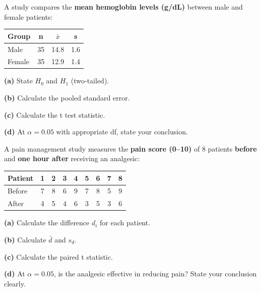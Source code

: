 \documentclass[
  12pt,
  letterpaper,
]{book}
\newcounter{none} %
\begin{document}
\begin{tcolorbox}[enhanced jigsaw, arc=.35mm, bottomrule=.15mm, bottomtitle=1mm, breakable, colback=white, colbacktitle=quarto-callout-caution-color!10!white, colframe=quarto-callout-caution-color-frame, coltitle=black, left=2mm, leftrule=.75mm, opacityback=0, opacitybacktitle=0.6, rightrule=.15mm, title={✏️ Exercise 2 --- Independent Samples t-Test}, titlerule=0mm, toprule=.15mm, toptitle=1mm]

A study compares the \textbf{mean hemoglobin levels (g/dL)} between male
and female patients:

{\def\LTcaptype{none} %
\begin{longtable}[]{@{}lccc@{}}
\toprule\noalign{}
Group & n & \(\bar{x}\) & s \\
\midrule\noalign{}
\endhead
\bottomrule\noalign{}
\endlastfoot
Male & 35 & 14.8 & 1.6 \\
Female & 35 & 12.9 & 1.4 \\
\end{longtable}
}

\textbf{(a)} State \(H_0\) and \(H_1\) (two-tailed).

\textbf{(b)} Calculate the pooled standard error.

\textbf{(c)} Calculate the t test statistic.

\textbf{(d)} At \(\alpha = 0.05\) with appropriate df, state your
conclusion.

\end{tcolorbox}

\begin{tcolorbox}[enhanced jigsaw, arc=.35mm, bottomrule=.15mm, bottomtitle=1mm, breakable, colback=white, colbacktitle=quarto-callout-caution-color!10!white, colframe=quarto-callout-caution-color-frame, coltitle=black, left=2mm, leftrule=.75mm, opacityback=0, opacitybacktitle=0.6, rightrule=.15mm, title={✏️ Exercise 3 --- Paired Samples t-Test}, titlerule=0mm, toprule=.15mm, toptitle=1mm]

A pain management study measures the \textbf{pain score (0--10)} of 8
patients \textbf{before} and \textbf{one hour after} receiving an
analgesic:

{\def\LTcaptype{none} %
\begin{longtable}[]{@{}lcccccccc@{}}
\toprule\noalign{}
Patient & 1 & 2 & 3 & 4 & 5 & 6 & 7 & 8 \\
\midrule\noalign{}
\endhead
\bottomrule\noalign{}
\endlastfoot
Before & 7 & 8 & 6 & 9 & 7 & 8 & 5 & 9 \\
After & 4 & 5 & 4 & 6 & 3 & 5 & 3 & 6 \\
\end{longtable}
}

\textbf{(a)} Calculate the difference \(d_i\) for each patient.

\textbf{(b)} Calculate \(\bar{d}\) and \(s_d\).

\textbf{(c)} Calculate the paired t statistic.

\textbf{(d)} At \(\alpha = 0.05\), is the analgesic effective in
reducing pain? State your conclusion clearly.

\end{tcolorbox}
\end{document}
